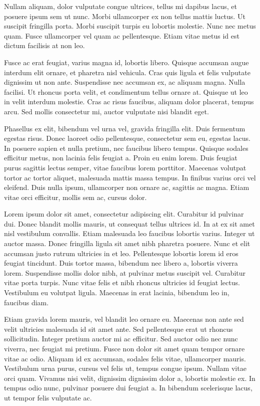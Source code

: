 Nullam aliquam, dolor vulputate congue ultrices, tellus mi dapibus lacus, et posuere ipsum sem ut nunc. Morbi ullamcorper ex non tellus mattis luctus. Ut suscipit fringilla porta. Morbi suscipit turpis eu lobortis molestie. Nunc nec metus quam. Fusce ullamcorper vel quam ac pellentesque. Etiam vitae metus id est dictum facilisis at non leo.

Fusce ac erat feugiat, varius magna id, lobortis libero. Quisque accumsan augue interdum elit ornare, et pharetra nisl vehicula. Cras quis ligula et felis vulputate dignissim ut non ante. Suspendisse nec accumsan ex, ac aliquam magna. Nulla facilisi. Ut rhoncus porta velit, et condimentum tellus ornare at. Quisque ut leo in velit interdum molestie. Cras ac risus faucibus, aliquam dolor placerat, tempus arcu. Sed mollis consectetur mi, auctor vulputate nisi blandit eget.

Phasellus ex elit, bibendum vel urna vel, gravida fringilla elit. Duis fermentum egestas risus. Donec laoreet odio pellentesque, consectetur sem eu, egestas lacus. In posuere sapien et nulla pretium, nec faucibus libero tempus. Quisque sodales efficitur metus, non lacinia felis feugiat a. Proin eu enim lorem. Duis feugiat purus sagittis lectus semper, vitae faucibus lorem porttitor. Maecenas volutpat tortor ac tortor aliquet, malesuada mattis massa tempus. In finibus varius orci vel eleifend. Duis nulla ipsum, ullamcorper non ornare ac, sagittis ac magna. Etiam vitae orci efficitur, mollis sem ac, cursus dolor.

Lorem ipsum dolor sit amet, consectetur adipiscing elit. Curabitur id pulvinar dui. Donec blandit mollis mauris, ut consequat tellus ultrices id. In at ex sit amet nisl vestibulum convallis. Etiam malesuada leo faucibus lobortis varius. Integer ut auctor massa. Donec fringilla ligula sit amet nibh pharetra posuere. Nunc et elit accumsan justo rutrum ultricies in et leo. Pellentesque lobortis lorem id eros feugiat tincidunt. Duis tortor massa, bibendum nec libero a, lobortis viverra lorem. Suspendisse mollis dolor nibh, at pulvinar metus suscipit vel. Curabitur vitae porta turpis. Nunc vitae felis et nibh rhoncus ultricies id feugiat lectus. Vestibulum eu volutpat ligula. Maecenas in erat lacinia, bibendum leo in, faucibus diam.

Etiam gravida lorem mauris, vel blandit leo ornare eu. Maecenas non ante sed velit ultricies malesuada id sit amet ante. Sed pellentesque erat ut rhoncus sollicitudin. Integer pretium auctor mi ac efficitur. Sed auctor odio nec nunc viverra, nec feugiat mi pretium. Fusce non dolor sit amet quam tempor ornare vitae ac odio. Aliquam id ex accumsan, sodales felis vitae, ullamcorper mauris. Vestibulum urna purus, cursus vel felis ut, tempus congue ipsum. Nullam vitae orci quam. Vivamus nisi velit, dignissim dignissim dolor a, lobortis molestie ex. In tempus odio nunc, pulvinar posuere dui feugiat a. In bibendum scelerisque lacus, ut tempor felis vulputate ac.


